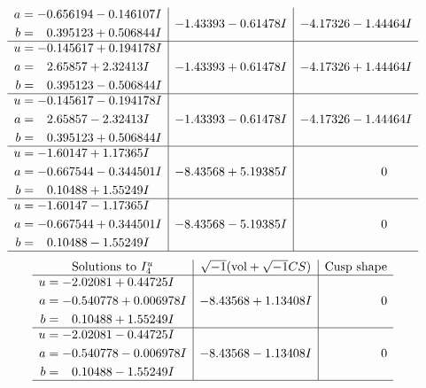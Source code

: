 \documentclass[1p]{elsarticle_modified}
\theoremstyle{definition}
\newcommand{\I}{\sqrt{-1}}
\begin{document}
$$\begin{array}{c|c|c}
\begin{aligned}
a &= -0.656194 - 0.146107 I \\
b &= \phantom{-}0.395123 + 0.506844 I\end{aligned}
 & -1.43393 - 0.61478 I & -4.17326 - 1.44464 I \\ \hline\begin{aligned}
u &= -0.145617 + 0.194178 I \\
a &= \phantom{-}2.65857 + 2.32413 I \\
b &= \phantom{-}0.395123 - 0.506844 I\end{aligned}
 & -1.43393 + 0.61478 I & -4.17326 + 1.44464 I \\ \hline\begin{aligned}
u &= -0.145617 - 0.194178 I \\
a &= \phantom{-}2.65857 - 2.32413 I \\
b &= \phantom{-}0.395123 + 0.506844 I\end{aligned}
 & -1.43393 - 0.61478 I & -4.17326 - 1.44464 I \\ \hline\begin{aligned}
u &= -1.60147 + 1.17365 I \\
a &= -0.667544 - 0.344501 I \\
b &= \phantom{-}0.10488 + 1.55249 I\end{aligned}
 & -8.43568 + 5.19385 I & \phantom{-0.000000 } 0 \\ \hline\begin{aligned}
u &= -1.60147 - 1.17365 I \\
a &= -0.667544 + 0.344501 I \\
b &= \phantom{-}0.10488 - 1.55249 I\end{aligned}
 & -8.43568 - 5.19385 I & \phantom{-0.000000 } 0\\
 \hline 
 \end{array}$$\newpage$$\begin{array}{c|c|c}  
\text{Solutions to }I^u_{4}& \I (\text{vol} + \sqrt{-1}CS) & \text{Cusp shape}\\
 \hline 
\begin{aligned}
u &= -2.02081 + 0.44725 I \\
a &= -0.540778 + 0.006978 I \\
b &= \phantom{-}0.10488 + 1.55249 I\end{aligned}
 & -8.43568 + 1.13408 I & \phantom{-0.000000 } 0 \\ \hline\begin{aligned}
u &= -2.02081 - 0.44725 I \\
a &= -0.540778 - 0.006978 I \\
b &= \phantom{-}0.10488 - 1.55249 I\end{aligned}
 & -8.43568 - 1.13408 I & \phantom{-0.000000 } 0\\
 \hline 
 \end{array}$$\newpage
\end{document}
